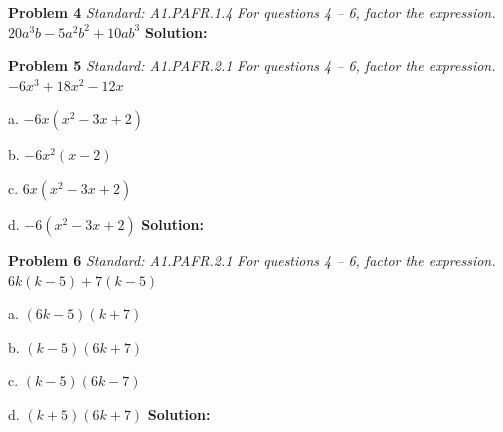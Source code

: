 \documentclass[11pt]{article}
\begin{document}
\begin{minipage}{\textwidth}
\noindent\textbf{Problem 4}
\hfill\textit{\color{gray}Standard: A1.PAFR.1.4}
\vspace{0.3em}
\noindent\textit{For questions 4 – 6, factor the expression.}
\vspace{0.3em}
\noindent $20a^{3}b - 5a^{2}b^{2} + 10ab^{3}$
\vspace{0.5em}
\noindent\textbf{Solution:} 
\end{minipage}
\vspace{1.5em}
\hrulefill
\vspace{1.5em}

\begin{minipage}{\textwidth}
\noindent\textbf{Problem 5}
\hfill\textit{\color{gray}Standard: A1.PAFR.2.1}
\vspace{0.3em}
\noindent\textit{For questions 4 – 6, factor the expression.}
\vspace{0.3em}
\noindent $-6x^{3} + 18x^{2} - 12x$

\quad a. $-6x(x^{2} - 3x + 2)$

\quad b. $-6x^{2}(x - 2)$

\quad c. $6x(x^{2} - 3x + 2)$

\quad d. $-6(x^{2} - 3x + 2)$
\vspace{0.5em}
\noindent\textbf{Solution:} 
\end{minipage}
\vspace{1.5em}
\hrulefill
\vspace{1.5em}

\begin{minipage}{\textwidth}
\noindent\textbf{Problem 6}
\hfill\textit{\color{gray}Standard: A1.PAFR.2.1}
\vspace{0.3em}
\noindent\textit{For questions 4 – 6, factor the expression.}
\vspace{0.3em}
\noindent $6k(k - 5) + 7(k - 5)$

\quad a. $(6k - 5)(k + 7)$

\quad b. $(k - 5)(6k + 7)$

\quad c. $(k - 5)(6k - 7)$

\quad d. $(k + 5)(6k + 7)$
\vspace{0.5em}
\noindent\textbf{Solution:} 
\end{minipage}
\vspace{1.5em}
\hrulefill
\vspace{1.5em}
\end{document}
